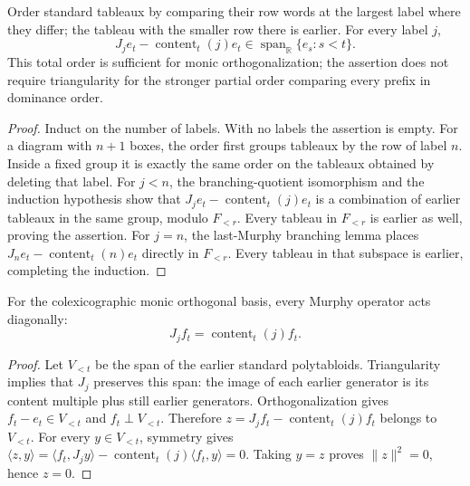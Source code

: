 \begin{lemma}
\label{lem:prefix-content-triangular}
\leanok
Order standard tableaux by comparing their row words at the largest
label where they differ; the tableau with the smaller row there is
earlier. For every label $j$,
\[
 J_je_t-\operatorname{content}_t(j)e_t
 \in\operatorname{span}_{\mathbb R}\{e_s:s<t\}.
\]
This total order is sufficient for monic orthogonalization; the assertion
does not require triangularity for the stronger partial order comparing
every prefix in dominance order.
\end{lemma}
\begin{proof}
Induct on the number of labels. With no labels the assertion is empty.
For a diagram with $n+1$ boxes, the order first groups tableaux by
the row of label $n$. Inside a fixed group it is exactly the same
order on the tableaux obtained by deleting that label. For $j<n$,
the branching-quotient isomorphism and the induction hypothesis
show that $J_je_t-\operatorname{content}_t(j)e_t$ is a combination
of earlier tableaux in the same group, modulo $F_{<r}$. Every
tableau in $F_{<r}$ is earlier as well, proving the assertion.
For $j=n$, the last-Murphy branching lemma places
$J_ne_t-\operatorname{content}_t(n)e_t$ directly in $F_{<r}$.
Every tableau in that subspace is earlier, completing the induction.
\end{proof}

\begin{lemma}
\label{lem:orthogonal-content-eigenvalues}
\leanok
For the colexicographic monic orthogonal basis, every Murphy operator
acts diagonally:
\[
 J_j f_t=\operatorname{content}_t(j) f_t.
\]
\end{lemma}
\begin{proof}
Let $V_{<t}$ be the span of the earlier standard polytabloids.
Triangularity implies that $J_j$ preserves this span: the image of
each earlier generator is its content multiple plus still earlier
generators. Orthogonalization gives $f_t-e_t\in V_{<t}$ and
$f_t\perp V_{<t}$. Therefore
$z=J_j f_t-\operatorname{content}_t(j)f_t$ belongs to $V_{<t}$.
For every $y\in V_{<t}$, symmetry gives
$\langle z,y\rangle=\langle f_t,J_jy\rangle-
\operatorname{content}_t(j)\langle f_t,y\rangle=0$.
Taking $y=z$ proves $\|z\|^2=0$, hence $z=0$.
\end{proof}

